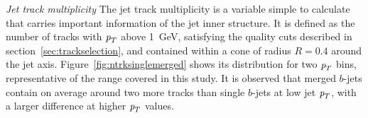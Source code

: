 

{ \em Jet track multiplicity} The jet track multiplicity is a variable simple to calculate that carries important information of the jet inner structure. It is defined as the number of tracks with ${\emph{p}_{T}}$ above 1~GeV, satisfying the quality cuts described in section~\ref{sec:trackselection}, and contained within a cone of radius $R=0.4$ around the jet axis.  Figure~\ref{fig:ntrksinglemerged} shows its distribution for two ${\emph{p}_{T}}$ bins, representative of the range covered in this study.  It is observed that merged $b$-jets contain on average around two more tracks than single $b$-jets at low jet ${\emph{p}_{T}}$, with a larger difference at higher ${\emph{p}_{T}}$ values. 


